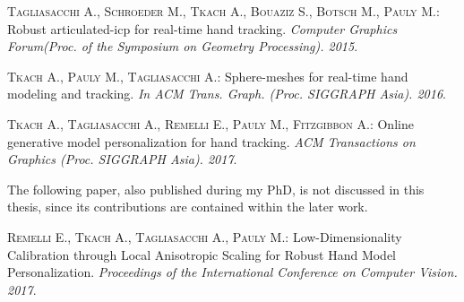 \begin{adjustwidth}{2.5em}{0pt}
\textsc{Tagliasacchi A., Schroeder M., Tkach A., Bouaziz S., Botsch M., Pauly
M.}: Robust articulated-icp for real-time hand tracking. \textit{Computer Graphics
Forum(Proc. of the Symposium on Geometry Processing). 2015}.

\textsc{Tkach A., Pauly M., Tagliasacchi A.}: Sphere-meshes for real-time hand
modeling and tracking. \textit{In ACM Trans. Graph. (Proc. SIGGRAPH Asia). 2016}.

\textsc{Tkach A., Tagliasacchi A., Remelli E., Pauly M., Fitzgibbon A.}: Online generative model personalization for hand tracking. \textit{ACM Transactions on Graphics (Proc. SIGGRAPH Asia). 2017}.
\end{adjustwidth}

The following paper, also published during my PhD, is not discussed in this thesis, since its contributions are contained within the later work.

\begin{adjustwidth}{2.5em}{0pt}
\textsc{Remelli E., Tkach A., Tagliasacchi A., Pauly M.}: Low-Dimensionality Calibration through Local Anisotropic Scaling for Robust Hand Model Personalization. \textit{Proceedings of the International Conference on Computer Vision. 2017}.
\end{adjustwidth}

